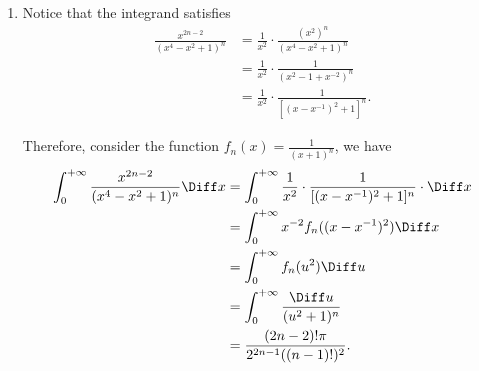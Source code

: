 \begin{enumerate}
    \item Notice that the integrand satisfies
          \begin{align*}
              \frac{x^{2n - 2}}{(x^4 - x^2 + 1)^n} & = \frac{1}{x^2} \cdot \frac{(x^2)^{n}}{(x^4 - x^2 + 1)^n} \\
                                                   & = \frac{1}{x^2} \cdot \frac{1}{(x^2 - 1 + x^{-2})^n}      \\
                                                   & = \frac{1}{x^2} \cdot \frac{1}{[(x - x^{-1})^2 + 1]^n}.
          \end{align*}

          Therefore, consider the function \(f_n(x) = \frac{1}{(x + 1)^n}\), we have
          \begin{align*}
              \int_{0}^{+\infty} \frac{x^{2n - 2}}{(x^4 - x^2 + 1)^n} \Diff x & = \int_{0}^{+\infty} \frac{1}{x^2} \cdot \frac{1}{[(x - x^{-1})^2 + 1]^n} \cdot \Diff x \\
                                                                              & = \int_0^{+\infty} x^{-2} f_n((x - x^{-1})^2) \Diff x                                   \\
                                                                              & = \int_0^{+\infty} f_n(u^2) \Diff u                                                     \\
                                                                              & = \int_0^{+\infty} \frac{\Diff u}{(u^2 + 1)^n}                                          \\
                                                                              & = \frac{(2n - 2)! \pi}{2^{2n - 1} ((n - 1)!)^2}.
          \end{align*}
\end{enumerate}